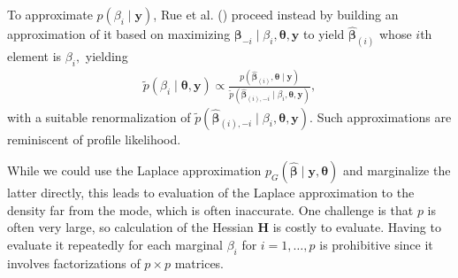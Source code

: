 \documentclass[
  11pt,
  letterpaper,
]{scrbook}
\theoremstyle{definition}
\theoremstyle{plain}
\theoremstyle{plain}
\theoremstyle{plain}
\theoremstyle{definition}
\theoremstyle{definition}
\theoremstyle{plain}
\theoremstyle{plain}
\theoremstyle{remark}
\begin{document}
To approximate \(p(\beta_i \mid \boldsymbol{y})\), Rue et al.
() proceed instead by
building an approximation of it based on maximizing
\(\boldsymbol{\beta}_{-i} \mid \beta_i, \boldsymbol{\theta}, \boldsymbol{y}\)
to yield \(\widehat{\boldsymbol{\beta}}_{(i)}\) whose \(i\)th element is
\(\beta_i,\) yielding \begin{align*}
\widetilde{p}(\beta_i \mid \boldsymbol{\theta}, \boldsymbol{y}) \propto \frac{p(\widehat{\boldsymbol{\beta}}_{(i)}, \boldsymbol{\theta} \mid \boldsymbol{y})}{\widetilde{p}(\widehat{\boldsymbol{\beta}}_{(i),-i} \mid \beta_i, \boldsymbol{\theta}, \boldsymbol{y})},
\end{align*} with a suitable renormalization of
\(\widetilde{p}(\widehat{\boldsymbol{\beta}}_{(i),-i} \mid \beta_i, \boldsymbol{\theta}, \boldsymbol{y}).\)
Such approximations are reminiscent of profile likelihood.

While we could use the Laplace approximation
\(p_{G}(\widehat{\boldsymbol{\beta}} \mid \boldsymbol{y}, \boldsymbol{\theta})\)
and marginalize the latter directly, this leads to evaluation of the
Laplace approximation to the density far from the mode, which is often
inaccurate. One challenge is that \(p\) is often very large, so
calculation of the Hessian \(\mathbf{H}\) is costly to evaluate. Having
to evaluate it repeatedly for each marginal \(\beta_i\) for
\(i=1, \ldots, p\) is prohibitive since it involves factorizations of
\(p \times p\) matrices.
\end{document}
